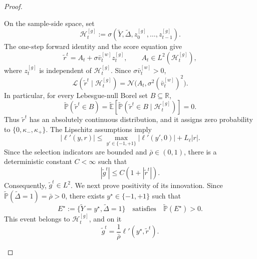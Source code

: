 \begin{proof}
\begin{enumerate}[wide]
            On the sample-side space, set
            \[
                \mathcal H_t^{[g]}
                :=
                \sigma(
                    \tilde Y,\tilde\Delta,
                    z_0^{[g]},\ldots,z_{t-1}^{[g]}
                ).
            \]
            The one-step forward identity and the score equation give
            \begin{equation}
                \tilde r^t
                =
                A_t+\sigma\bar v_t^{[w]}z_t^{[g]},
                \qquad
                A_t\in L^2(\mathcal H_t^{[g]}),
                \label{eq:mf-proof-score-fresh-noise}
            \end{equation}
            where $z_t^{[g]}$ is independent of $\mathcal H_t^{[g]}$.
            Since $\sigma\bar v_t^{[w]}>0$,
            \[
                \mathscr L(\tilde r^t\mid\mathcal H_t^{[g]})
                =
                \mathcal N\bigl(A_t,\sigma^2(\bar v_t^{[w]})^2\bigr).
            \]
            In particular, for every Lebesgue-null Borel set
            $B\subseteq\mathbb R$,
            \[
                \tilde{\mathbb P}(\tilde r^t\in B)
                =
                \tilde{\mathbb E}
                \left[
                    \tilde{\mathbb P}
                    (\tilde r^t\in B\mid\mathcal H_t^{[g]})
                \right]
                =0.
            \]
            Thus $\tilde r^t$ has an absolutely continuous distribution,
            and it assigns zero probability to
            $\{0,\kappa_-,\kappa_+\}$.
            The Lipschitz assumptions imply
            \[
                |\ell'(y,r)|
                \leq
                \max_{y'\in\{-1,+1\}}|\ell'(y',0)|
                +L_\ell|r|.
            \]
            Since the selection indicators are bounded and
            $\bar\rho\in(0,1)$, there is a deterministic constant
            $C<\infty$ such that
            \[
                |\tilde g^t|\leq C(1+|\tilde r^t|).
            \]
            Consequently, $\tilde g^t\in L^2$.
            We next prove positivity of its innovation.
            Since $\tilde{\mathbb P}(\tilde\Delta=1)=\bar\rho>0$,
            there exists $y^\star\in\{-1,+1\}$ such that
            \[
                E^\star
                :=
                \{\tilde Y=y^\star,\tilde\Delta=1\}
                \quad\text{satisfies}\quad
                \tilde{\mathbb P}(E^\star)>0.
            \]
            This event belongs to $\mathcal H_t^{[g]}$, and on it
            \[
                \tilde g^t
                =
                \frac1{\bar\rho}\ell'(y^\star,\tilde r^t).
\]
\end{enumerate}
\end{proof}
